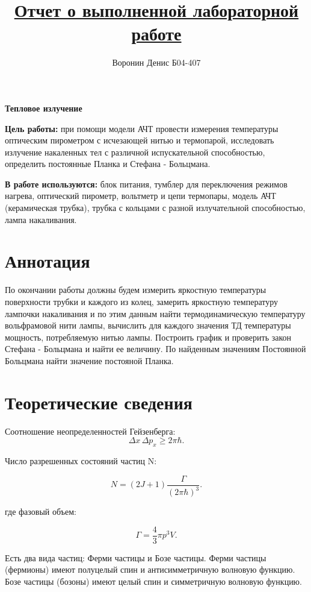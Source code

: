 \documentclass[a4paper]{article}
\title{\underline{Отчет о выполненной лабораторной работе}}
\author{Воронин Денис Б04-407}
\begin{document}
\maketitle

\begin{center}
\textbf{\Large Тепловое излучение}
\end{center}

\textbf{Цель работы:} при помощи модели АЧТ провести измерения температуры оптическим пирометром с исчезающей нитью и термопарой, исследовать излучение накаленных тел с различной испускательной способностью, определить постоянные Планка и Стефана - Больцмана.

\textbf{В работе используются:} блок питания, тумблер для переключения режимов нагрева, оптический пирометр, вольтметр и цепи термопары, модель АЧТ (керамическая трубка), трубка с кольцами с разной излучательной способностью, лампа накаливания.

\section{Аннотация}

По окончании работы должны будем измерить яркостную температуры поверхности трубки и каждого из колец, замерить яркостную температуру лампочки накаливания и по этим данным найти термодинамическую температуру вольфрамовой нити лампы, вычислить для каждого значения ТД температуры мощность, потребляемую нитью лампы. 
Построить график и проверить закон Стефана - Больцмана и найти ее величину. По найденным значениям Постоянной Больцмана найти значение постояной Планка.

\section{Теоретические сведения}

Соотношение неопределенностей Гейзенберга:
\[
\Delta x \, \Delta p_x \geqslant 2\pi\hbar. \tag{1}
\]

Число разрешенных состояний частиц N: 

\[
N = (2J + 1) \frac{\Gamma}{(2\pi\hbar)^3}. \tag{2}
\]

где фазовый объем:

\[
\Gamma = \frac{4}{3} \pi p^3 V.\tag{3}
\]

Есть два вида частиц: Ферми частицы и Бозе частицы. Ферми частицы (фермионы) имеют полуцелый спин и антисимметричную волновую функцию.
Бозе частицы (бозоны) имеют целый спин и симметричную волновую функцию.\par
\end{document}
